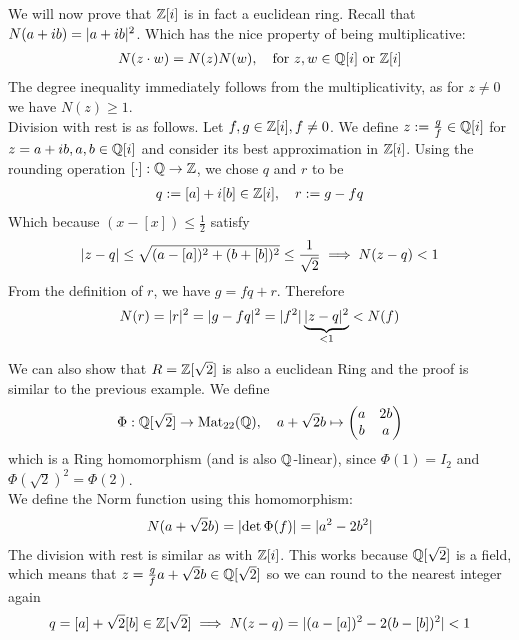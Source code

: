 We will now prove that $\mathbb{Z}[i]$ is in fact a euclidean ring. Recall that $N(a + ib) = \vert a + ib\vert^2$. Which has the nice property of being multiplicative:
\begin{align*}
	N(z \cdot w) = N(z) N(w), \quad \text{for } z,w \in \mathbb{Q}[i] \text{ or } \mathbb{Z}[i]
\end{align*}
The degree inequality immediately follows from the multiplicativity, as for $z \neq 0$ we have $N(z) \geq 1$.\\
Division with rest is as follows. Let $f,g \in \mathbb{Z}[i], f \neq 0$. We define $z := \frac{g}{f} \in \mathbb{Q}[i]$ for $z = a + ib, a,b \in \mathbb{Q}[i]$ and consider its best approximation in $\mathbb{Z}[i]$. Using the rounding operation $[\cdot]: \mathbb{Q} \to \mathbb{Z}$, we chose $q$ and $r$ to be
\begin{align*}
	q := [a] + i [b] \in \mathbb{Z}[i], \quad r := g - fq 
\end{align*}
Which because $(x - [x]) \leq \frac{1}{2}$ satisfy
\begin{align*}
	\vert z-q\vert \leq \sqrt{(a - [a])^2 + (b + [b])^2} \leq \frac{1}{\sqrt{2}} \implies N(z-q) < 1
\end{align*}
From the definition of $r$, we have $g = fq + r$. Therefore
\begin{align*}
	N(r) = \vert r\vert^2 = \vert g-fq\vert^2 = \vert f^2\vert \underbrace{\vert z-q\vert^2}_{< 1} < N(f)
\end{align*}


We can also show that $R = \mathbb{Z}[\sqrt{2}]$ is also a euclidean Ring and the proof is similar to the previous example. We define
\begin{align*}
	\Phi: \mathbb{Q}[\sqrt{2}] \to \operatorname{Mat}_{22}(\mathbb{Q}), \quad a + \sqrt{2}b \mapsto \begin{pmatrix}
	a & 2b\\
	b & a
	\end{pmatrix}
\end{align*}
which is a Ring homomorphism (and is also $\mathbb{Q}$-linear), since $\Phi(1) = I_2$ and $\Phi(\sqrt{2})^2 = \Phi(2)$.\\
We define the Norm function using this homomorphism:
\begin{align*}
	N(a + \sqrt{2}b) = \abs{\det \Phi(f)} = \abs{a^2 - 2b^2}
\end{align*}
The division with rest is similar as with $\mathbb{Z}[i]$. This works because $\mathbb{Q}[\sqrt{2}]$ is a field, which means that $z = \frac{g}{f} a + \sqrt{2}b \in \mathbb{Q}[\sqrt{2}]$ so we can round to the nearest integer again
\begin{align*}
	q = [a] + \sqrt{2}[b] \in \mathbb{Z}[\sqrt{2}] \implies N(z-q) = \vert(a-[a])^2 - 2(b-[b])^2\vert < 1
\end{align*}


